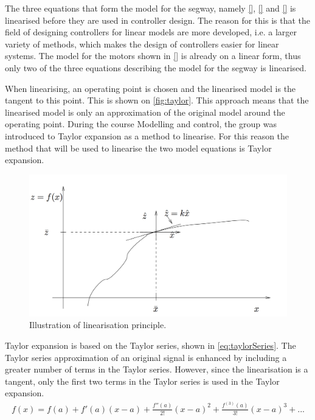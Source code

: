 The three equations that form the model for the segway, namely \autoref{}, \autoref{} and \autoref{} is linearised before they are used in controller design. The reason for this is that the field of designing controllers for linear models are more developed, i.e. a larger variety of methods, which makes the design of controllers easier for linear systems. The model for the motors shown in \autoref{} is already on a linear form, thus only two of the three equations describing the model for the segway is linearised.

When linearising, an operating point is chosen and the linearised model is the tangent to this point. This is shown on \autoref{fig:taylor}. This approach means that the linearised model is only an approximation of the original model around the operating point. During the course Modelling and control, the group was introduced to Taylor expansion as a method to linearise. For this reason the method that will be used to linearise the two model equations is Taylor expansion.

\begin{figure}[H]
\centering
\includegraphics[scale=0.6]{figures/taylor.png}
\caption{Illustration of linearisation principle.}
\label{fig:taylor}
\end{figure}
Taylor expansion is based on the Taylor series, shown in \autoref{eq:taylorSeries}. The Taylor series approximation of an original signal is enhanced by including a greater number of terms in the Taylor series. However, since the linearisation is a tangent, only the first two terms in the Taylor series is used in the Taylor expansion.
\begin{align}
f(x) = f(a) + f'(a)(x - a) + \frac{f''(a)}{2!}(x - a)^2 + \frac{f^{(3)}(a)}{3!}(x - a)^3 + ...
\label{eq:taylorSeries}
\end{align}


